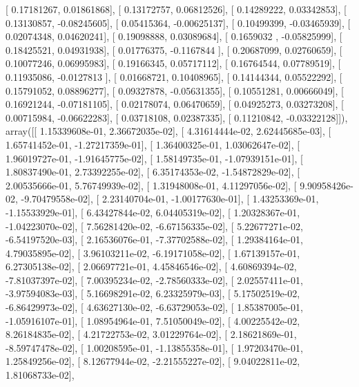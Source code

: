 \documentclass{article}
\begin{document}
       [ 0.17181267,  0.01861868],
       [ 0.13172757,  0.06812526],
       [ 0.14289222,  0.03342853],
       [ 0.13130857, -0.08245605],
       [ 0.05415364, -0.00625137],
       [ 0.10499399, -0.03465939],
       [ 0.02074348,  0.04620241],
       [ 0.19098888,  0.03089684],
       [ 0.1659032 , -0.05825999],
       [ 0.18425521,  0.04931938],
       [ 0.01776375, -0.1167844 ],
       [ 0.20687099,  0.02760659],
       [ 0.10077246,  0.06995983],
       [ 0.19166345,  0.05717112],
       [ 0.16764544,  0.07789519],
       [ 0.11935086, -0.0127813 ],
       [ 0.01668721,  0.10408965],
       [ 0.14144344,  0.05522292],
       [ 0.15791052,  0.08896277],
       [ 0.09327878, -0.05631355],
       [ 0.10551281,  0.00666049],
       [ 0.16921244, -0.07181105],
       [ 0.02178074,  0.06470659],
       [ 0.04925273,  0.03273208],
       [ 0.00715984, -0.06622283],
       [ 0.03718108,  0.02387335],
       [ 0.11210842, -0.03322128]]), array([[  1.15339608e-01,   2.36672035e-02],
       [  4.31614444e-02,   2.62445685e-03],
       [  1.65741452e-01,  -1.27217359e-01],
       [  1.36400325e-01,   1.03062647e-02],
       [  1.96019727e-01,  -1.91645775e-02],
       [  1.58149735e-01,  -1.07939151e-01],
       [  1.80837490e-01,   2.73392255e-02],
       [  6.35174353e-02,  -1.54872829e-02],
       [  2.00535666e-01,   5.76749939e-02],
       [  1.31948008e-01,   4.11297056e-02],
       [  9.90958426e-02,  -9.70479558e-02],
       [  2.23140704e-01,  -1.00177630e-01],
       [  1.43253369e-01,  -1.15533929e-01],
       [  6.43427844e-02,   6.04405319e-02],
       [  1.20328367e-01,  -1.04223070e-02],
       [  7.56281420e-02,  -6.67156335e-02],
       [  5.22677271e-02,  -6.54197520e-03],
       [  2.16536076e-01,  -7.37702588e-02],
       [  1.29384164e-01,   4.79035895e-02],
       [  3.96103211e-02,  -6.19171058e-02],
       [  1.67139157e-01,   6.27305138e-02],
       [  2.06697721e-01,   4.45846546e-02],
       [  4.60869394e-02,  -7.81037397e-02],
       [  7.00395234e-02,  -2.78560333e-02],
       [  2.02557411e-01,  -3.97594083e-03],
       [  5.16698291e-02,   6.23325979e-03],
       [  5.17502519e-02,  -6.86429973e-02],
       [  4.63627130e-02,  -6.63729053e-02],
       [  1.85387005e-01,  -1.05916107e-01],
       [  1.08954964e-01,   7.51050049e-02],
       [  4.00225542e-02,   8.26184835e-02],
       [  4.21722753e-02,   3.01229764e-02],
       [  2.18621869e-01,  -8.59747478e-02],
       [  1.00208595e-01,  -1.13855358e-01],
       [  1.97203470e-01,   1.25849256e-02],
       [  8.12677944e-02,  -2.21555227e-02],
       [  9.04022811e-02,   1.81068733e-02],
\end{document}
